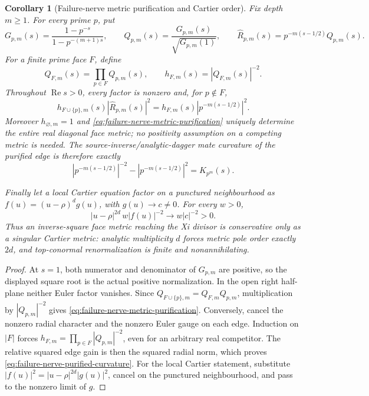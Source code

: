 \documentclass[11pt]{article}
\newtheorem{corollary}[theorem]{Corollary}
\theoremstyle{definition}
\theoremstyle{remark}
\newcommand{\Rea}{\operatorname{Re}}
\begin{document}
\begin{corollary}[Failure-nerve metric purification and Cartier order]
\label{cor:deninger-failure-nerve-cartier-metric}
Fix depth \(m\geq1\).  For every prime \(p\), put
\[
 G_{p,m}(s)=\frac{1-p^{-s}}{1-p^{-(m+1)s}},\qquad
 Q_{p,m}(s)=\frac{G_{p,m}(s)}{\sqrt{G_{p,m}(1)}},\qquad
 \widehat R_{p,m}(s)=p^{-m(s-1/2)}Q_{p,m}(s).
\tag{7.6R7}\label{eq:failure-nerve-actual-transition}
\]
For a finite prime face \(F\), define
\[
 Q_{F,m}(s)=\prod_{p\in F}Q_{p,m}(s),\qquad
 h_{F,m}(s)=|Q_{F,m}(s)|^{-2}.
\tag{7.6R8}\label{eq:failure-nerve-face-metric}
\]
Throughout \(\Rea s>0\), every factor is nonzero and, for \(p\notin F\),
\[
 h_{F\cup\{p\},m}(s)|\widehat R_{p,m}(s)|^2
 =h_{F,m}(s)|p^{-m(s-1/2)}|^2.
\tag{7.6R9}\label{eq:failure-nerve-metric-purification}
\]
Moreover \(h_{\varnothing,m}=1\) and
\eqref{eq:failure-nerve-metric-purification} uniquely determine the entire
real diagonal face metric; no positivity assumption on a competing metric is
needed.  The source-inverse/analytic-dagger mate curvature of the purified
edge is therefore exactly
\[
 |p^{-m(s-1/2)}|^{-2}-|p^{-m(s-1/2)}|^2
 =K_{p^m}(s).
\tag{7.6R10}\label{eq:failure-nerve-purified-curvature}
\]

Finally let a local Cartier equation factor on a punctured neighbourhood as
\(f(u)=(u-\rho)^d g(u)\), with \(g(u)\to c\ne0\).  For every \(w>0\),
\[
 |u-\rho|^{2d}\,w|f(u)|^{-2}
 \longrightarrow w|c|^{-2}>0.
\tag{7.6R11}\label{eq:failure-nerve-cartier-renormalization}
\]
Thus an inverse-square face metric reaching the Xi divisor is conservative
only as a singular Cartier metric: analytic multiplicity \(d\) forces metric
pole order exactly \(2d\), and top-conormal renormalization is finite and
nonannihilating.
\end{corollary}

\begin{proof}
At \(s=1\), both numerator and denominator of \(G_{p,m}\) are positive, so
the displayed square root is the actual positive normalization.  In the open
right half-plane neither Euler factor vanishes.  Since
\(Q_{F\cup\{p\},m}=Q_{F,m}Q_{p,m}\), multiplication by
\(|Q_{p,m}|^{-2}\) gives \eqref{eq:failure-nerve-metric-purification}.
Conversely, cancel the nonzero radial character and the nonzero Euler gauge
on each edge.  Induction on \(|F|\) forces
\(h_{F,m}=\prod_{p\in F}|Q_{p,m}|^{-2}\), even for an arbitrary real
competitor.  The relative squared edge gain is then the squared radial norm,
which proves \eqref{eq:failure-nerve-purified-curvature}.  For the local
Cartier statement, substitute
\(|f(u)|^2=|u-\rho|^{2d}|g(u)|^2\), cancel on the punctured neighbourhood,
and pass to the nonzero limit of \(g\).
\end{proof}
\end{document}
